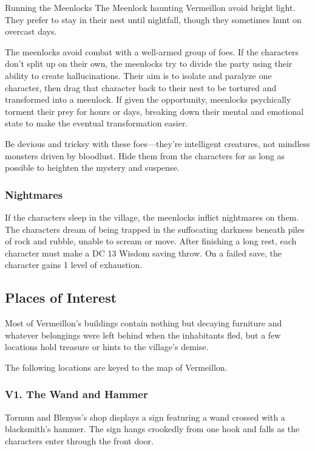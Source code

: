 \documentclass[10pt,a4paper,twoside,bg=print,twocolumn,openany,nodeprecatedcode]{dndbook}
\begin{document}
\begin{DndSidebar}[float=!b]{Running the Meenlocks}
The Meenlock haunting Vermeillon avoid bright light. They prefer to stay in their nest until nightfall, though they sometimes hunt on overcast days.



The meenlocks avoid combat with a well-armed group of foes. If the characters don't split up on their own, the meenlocks try to divide the party using their ability to create hallucinations. Their aim is to isolate and paralyze one character, then drag that character back to their nest to be tortured and transformed into a meenlock. If given the opportunity, meenlocks psychically torment their prey for hours or days, breaking down their mental and emotional state to make the eventual transformation easier.



Be devious and tricksy with these foes—they're intelligent creatures, not mindless monsters driven by bloodlust. Hide them from the characters for as long as possible to heighten the mystery and suspense.



\end{DndSidebar}

\subsubsection{Nightmares}
If the characters sleep in the village, the meenlocks inflict nightmares on them. The characters dream of being trapped in the suffocating darkness beneath piles of rock and rubble, unable to scream or move. After finishing a long rest, each character must make a DC 13 Wisdom saving throw. On a failed save, the character gains 1 level of exhaustion.

\subsection{Places of Interest}
Most of Vermeillon's buildings contain nothing but decaying furniture and whatever belongings were left behind when the inhabitants fled, but a few locations hold treasure or hints to the village's demise.

The following locations are keyed to the map of Vermeillon.

\subsubsection{V1. The Wand and Hammer}
Tormun and Blenyss's shop displays a sign featuring a wand crossed with a blacksmith's hammer. The sign hangs crookedly from one hook and falls as the characters enter through the front door.
\end{document}
